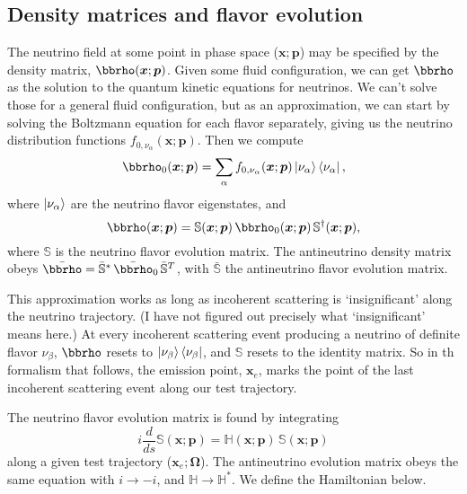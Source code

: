 \documentclass[aps,prd,twocolumn,superscriptaddress,groupedaddress]{revtex4}
\begin{document}
\subsection*{Density matrices and flavor evolution}
The neutrino field at some point in phase space ($\bm{x};\bm{p}$)
may be specified by the density matrix, $\bbrho(\bm{x};\bm{p})$.
Given some fluid configuration, we can get $\bbrho$ as the solution to
the quantum kinetic equations for neutrinos.
We can't solve those for a general fluid configuration,
but as an approximation, we can start by solving the Boltzmann equation for each
flavor separately, giving us the neutrino distribution functions
$f_{0,\nu_\alpha}(\bm{x};\bm{p})$. Then we compute
\begin{equation}
  \label{eq:def_unoscillated_rho}
  \bbrho_0(\bm{x};\bm{p}) =
  \sum\limits_{\alpha}f_{0,\nu_\alpha}(\bm{x};\bm{p})
  \ket{\nu_\alpha} \bra{\nu_\alpha},
\end{equation}
where $\ket{\nu_\alpha}$ are the neutrino flavor eigenstates, and
\begin{equation}
  \label{eq:density_evolution}
  \bbrho(\bm{x};\bm{p}) =
  \mathbb{S}(\bm{x};\bm{p})\,
  \bbrho_0(\bm{x};\bm{p})\,
  \mathbb{S}^\dagger(\bm{x};\bm{p}),
\end{equation}
where $\mathbb{S}$ is the neutrino flavor evolution matrix.
The antineutrino density matrix obeys
$\bar{\bbrho} = \bar{\mathbb{S}}^*\,\bar{\bbrho}_0\,\bar{\mathbb{S}}^T$,
with $\bar{\mathbb{S}}$ the antineutrino flavor evolution matrix.

This approximation works as long as incoherent scattering is
`insignificant' along the neutrino trajectory.
(I have not figured out precisely what `insignificant' means here.)
At every incoherent scattering
event producing a neutrino of definite flavor $\nu_\beta$,
$\bbrho$ resets to $\ket{\nu_\beta}\bra{\nu_\beta}$, and
$\mathbb{S}$ resets to the identity matrix.
So in th formalism that follows,
the emission point, $\bm{x}_e$, marks the point of the
last incoherent scattering event along our test trajectory.

The neutrino flavor evolution matrix is found by integrating
\begin{equation}
  \label{eq:S_evolution}
  i\frac{d}{ds} \mathbb{S}(\bm{x};\bm{p}) =
  \mathbb{H}(\bm{x};\bm{p})\,
  \mathbb{S}(\bm{x};\bm{p})
\end{equation}
along a given test trajectory ($\bm{x}_e;\bm{\Omega}$).
The antineutrino evolution matrix obeys the same equation with
$i\rightarrow-i$, and $\mathbb{H}\rightarrow\mathbb{H}^*$.
We define the Hamiltonian below.
\end{document}
